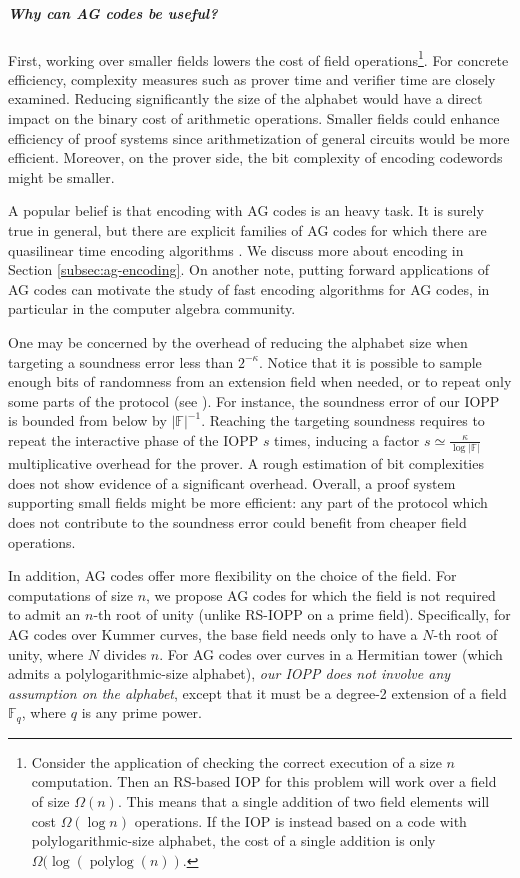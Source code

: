 \documentclass[a4paper,USenglish,autoref]{lipics-v2021}
\newcommand\F{\mathbb{F}}
\newcommand\Fq{\mathbb{F}_q}
\DeclareMathOperator{\polylog}{polylog}
\newcommand{\size}[1]{\left|#1\right|}
\begin{document}
\subparagraph*{Why can AG codes be useful?}
First, working over smaller fields lowers the cost of field operations\footnote{Consider the application of checking the correct execution of a size $n$ computation. Then an RS-based IOP for this problem will work over a field of size $\Omega(n)$. This means that a single addition of two field elements will cost $\Omega(\log n)$ operations. If the IOP is instead based on a code with polylogarithmic-size alphabet, the cost of a single addition is only $\Omega(\log(\polylog(n))$.}. For concrete efficiency, complexity measures such as prover time and verifier time are closely examined. Reducing significantly the size of the alphabet would have a direct impact on the binary cost of arithmetic operations.   
Smaller fields could enhance efficiency of proof systems since arithmetization of general circuits would be more efficient. Moreover, on the prover side, the bit complexity of encoding codewords might be smaller.


A popular belief is that encoding with AG codes is an heavy task. It is surely true in general, but there are explicit families of AG codes for which there are quasilinear time encoding algorithms \cite{BRS20}. We discuss more about encoding in Section \ref{subsec:ag-encoding}. On another note, putting forward applications of AG codes can motivate the study of fast encoding algorithms for AG codes, in particular in the computer algebra community.



One may be concerned by the overhead of reducing the alphabet size when targeting a soundness error less than $2^{-\kappa}$. Notice that it is possible to sample enough bits of randomness from an extension field when needed, or to repeat only some parts of the protocol (see \cite{ethSTARK,BBHR18a}). For instance, the soundness error of our IOPP is bounded from below by $\size \F^{-1}$. Reaching the targeting soundness requires to repeat the interactive phase of the IOPP $s$ times, inducing a factor $s \simeq \frac{\kappa}{\log \size \F}$ multiplicative overhead for the prover. A rough estimation of bit complexities does not show evidence of a significant overhead. Overall, a proof system supporting small fields might be more efficient: any part of the protocol which does not contribute to the soundness error could benefit from cheaper field operations. 


In addition, AG codes offer more flexibility on the choice of the field. For computations of size $n$, we propose AG codes for which the field is not required to admit an $n$-th root of unity (unlike RS-IOPP on a prime field). Specifically, for AG codes over Kummer curves, the base field needs only to have a $N$-th root of unity, where $N$ divides $n$. For AG codes over curves in a Hermitian tower (which admits a polylogarithmic-size alphabet), \emph{our IOPP does not involve any assumption on the alphabet}, except that it must be a degree-2 extension of a field $\Fq$, where $q$ is any prime power.
\end{document}
